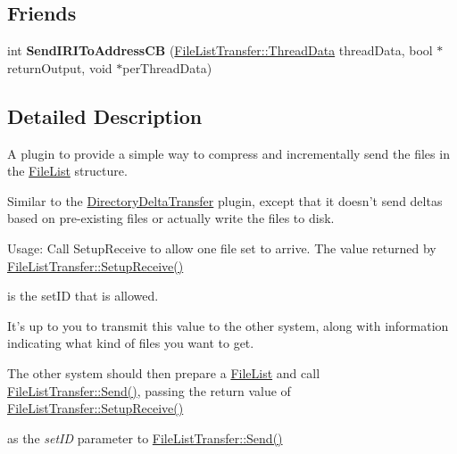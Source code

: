 \subsection*{Friends}
\begin{DoxyCompactItemize}
\item 
\hypertarget{class_rak_net_1_1_file_list_transfer_aede9a5e2ca9182231afd153a39e04bd4}{int {\bfseries Send\-I\-R\-I\-To\-Address\-C\-B} (\hyperlink{struct_rak_net_1_1_file_list_transfer_1_1_thread_data}{File\-List\-Transfer\-::\-Thread\-Data} thread\-Data, bool $\ast$return\-Output, void $\ast$per\-Thread\-Data)}\label{class_rak_net_1_1_file_list_transfer_aede9a5e2ca9182231afd153a39e04bd4}

\end{DoxyCompactItemize}


\subsection{Detailed Description}
A plugin to provide a simple way to compress and incrementally send the files in the \hyperlink{class_rak_net_1_1_file_list}{File\-List} structure. 

Similar to the \hyperlink{class_rak_net_1_1_directory_delta_transfer}{Directory\-Delta\-Transfer} plugin, except that it doesn't send deltas based on pre-\/existing files or actually write the files to disk.

Usage\-: Call Setup\-Receive to allow one file set to arrive. The value returned by \hyperlink{class_rak_net_1_1_file_list_transfer_afc31c7d166bfb3fb60944624e27ce388}{File\-List\-Transfer\-::\-Setup\-Receive()}\par
 is the set\-I\-D that is allowed.\par
 It's up to you to transmit this value to the other system, along with information indicating what kind of files you want to get.\par
 The other system should then prepare a \hyperlink{class_rak_net_1_1_file_list}{File\-List} and call \hyperlink{class_rak_net_1_1_file_list_transfer_ae0dd9c15eb9b045a2a912da9772271e2}{File\-List\-Transfer\-::\-Send()}, passing the return value of \hyperlink{class_rak_net_1_1_file_list_transfer_afc31c7d166bfb3fb60944624e27ce388}{File\-List\-Transfer\-::\-Setup\-Receive()}\par
 as the {\itshape set\-I\-D} parameter to \hyperlink{class_rak_net_1_1_file_list_transfer_ae0dd9c15eb9b045a2a912da9772271e2}{File\-List\-Transfer\-::\-Send()} 

